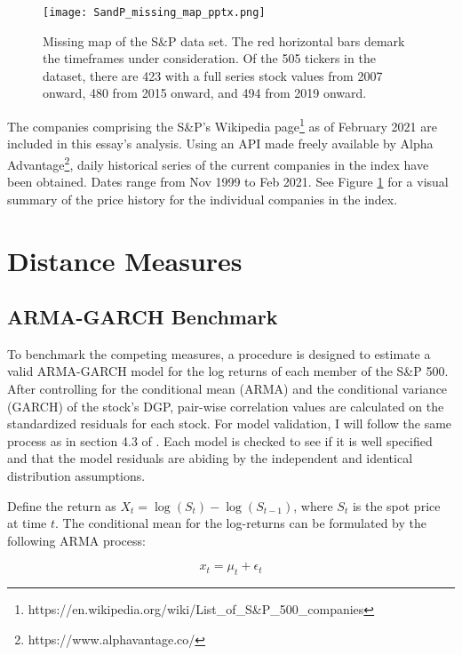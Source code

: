 \documentclass[12pt]{article}
\begin{document}
\begin{figure}
    \centering
    \texttt{[image: SandP\_missing\_map\_pptx.png]}
    \caption{Missing map of the S\&P data set. The red horizontal bars demark the timeframes under consideration. Of the 505 tickers in the dataset, there are 423 with a full series stock values from 2007 onward, 480 from 2015 onward, and 494 from 2019 onward.}
    \label{fig:SandP_missing_map}
\end{figure}


The companies comprising the S\&P's Wikipedia page\footnote{https://en.wikipedia.org/wiki/List\_of\_S\&P\_500\_companies} as of February 2021 are included in this essay's analysis. Using an API made freely available by Alpha Advantage\footnote{https://www.alphavantage.co/}, daily historical series of the current companies in the index have been obtained. Dates range from Nov 1999 to Feb 2021. See Figure \ref{fig:SandP_missing_map} for a visual summary of the price history for the individual companies in the index.

\section{Distance Measures}

\subsection{ARMA-GARCH Benchmark} \label{sec:ARMAGARCH-benchmark}

To benchmark the competing measures, a procedure is designed to estimate a valid ARMA-GARCH model for the log returns of each member of the S\&P 500. After controlling for the conditional mean (ARMA) and the conditional variance (GARCH) of the stock's DGP, pair-wise correlation values are calculated on the standardized residuals for each stock. For model validation, I will follow the same process as in section 4.3 of \cite{DowiakTV-COP}. Each model is checked to see if it is well specified and that the model residuals are abiding by the independent and identical distribution assumptions.

Define the return as $X_{t} = \log \left(S_{t}\right) - \log\left(S_{t-1}\right)$, where $S_{t}$ is the spot price at time $t$. The conditional mean for the log-returns can be formulated by the following ARMA process:

\begin{equation} \label{eqn:marginalModel}
    x_{t} = \mu_{t} + \epsilon_{t}
\end{equation}
\end{document}
